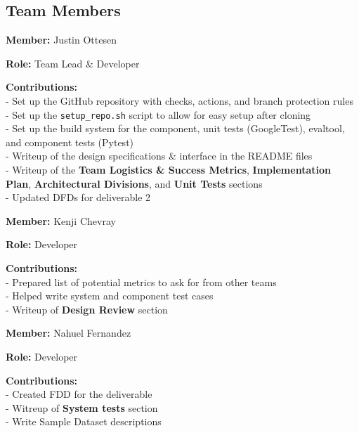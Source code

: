 \subsection*{Team Members}

\textbf{Member:} Justin Ottesen

\smallskip

\textbf{Role:} Team Lead \& Developer

\smallskip

\textbf{Contributions:} \\
- Set up the GitHub repository with checks, actions, and branch protection rules \\
- Set up the \verb|setup_repo.sh| script to allow for easy setup after cloning \\
- Set up the build system for the component, unit tests (GoogleTest), evaltool, and component tests (Pytest) \\
- Writeup of the design specifications \& interface in the README files \\
- Writeup of the \textbf{Team Logistics \& Success Metrics}, \textbf{Implementation Plan}, \textbf{Architectural Divisions}, and \textbf{Unit Tests} sections \\
- Updated DFDs for deliverable 2

\bigskip

\textbf{Member:} Kenji Chevray

\smallskip

\textbf{Role:} Developer

\smallskip

\textbf{Contributions:} \\
- Prepared list of potential metrics to ask for from other teams \\
- Helped write system and component test cases  \\
- Writeup of \textbf{Design Review} section

\bigskip

\textbf{Member:} Nahuel Fernandez

\smallskip

\textbf{Role:} Developer

\smallskip

\textbf{Contributions:} \\
- Created FDD for the deliverable \\
- Witreup of \textbf{System tests} section \\
- Write Sample Dataset descriptions


\bigskip

